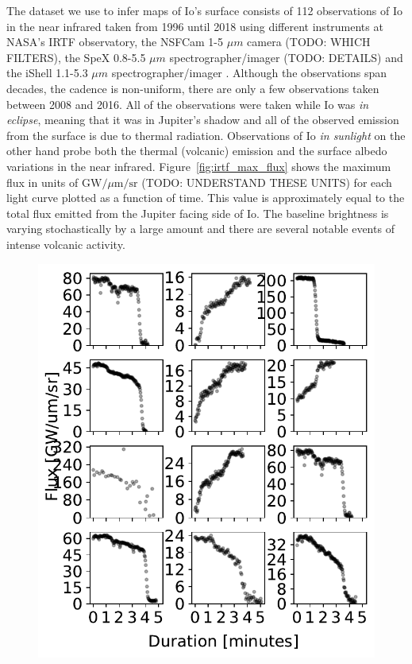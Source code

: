 \documentclass[modern]{aastex62}
\begin{document}
The dataset we use to infer maps of Io's surface consists of 112 observations of Io in the near infrared taken from 1996 until 2018 using different instruments at NASA's IRTF observatory, the NSFCam  1-5 $\mu m$ camera \citep{shure1994} (TODO: WHICH FILTERS), the SpeX 0.8-5.5 $\mu m$ spectrographer/imager \citep{rayner2003} (TODO: DETAILS) and the iShell 1.1-5.3 $\mu m$  spectrographer/imager \citep{johnrayner2016}.
Although the observations span decades, the cadence is non-uniform, there are only a few observations taken between 2008 and 2016.
All of the observations were taken while Io was \emph{in eclipse}, meaning that it was in Jupiter's shadow and all of the observed emission from the surface is due to thermal radiation.
Observations of Io \emph{in sunlight} on the other hand probe both the thermal (volcanic) emission and the surface albedo variations in the near infrared.
Figure~\ref{fig:irtf_max_flux} shows the maximum flux in units of $\mathrm{GW}/\mu \mathrm{m}/\mathrm{sr}$ (TODO: UNDERSTAND THESE UNITS) for each light curve plotted as a function of time.
This value is approximately equal to the total flux emitted from the Jupiter facing side of Io.
The baseline brightness is varying stochastically by a large amount and there are several notable events of intense volcanic activity.

\begin{figure}[h!]
    \begin{centering}
    \includegraphics[width=0.5\linewidth]{figures/irtf_sample_lightcurves.pdf}
    \end{centering}
\end{figure}
\end{document}
